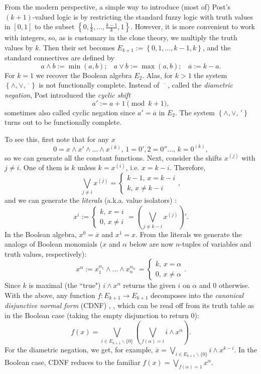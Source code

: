\documentclass[11pt]{article}
\theoremstyle{plain}
\theoremstyle{definition}
\def\ds{\displaystyle}
\def\-{\backslash}
\def\a{\alpha}
\def\nx{\overline{x}}
\begin{document}
From the modern perspective, a simple way to introduce (most of) Post's $(k+1)$-valued logic is by restricting the standard fuzzy logic with truth values in $[0,1]$ to the subset $\ds{\left\{0,\frac1k,\dots,\frac{k-1}k,1\right\}}$. However, it is more convenient to work with integers, so, as is customary in the clone theory, we multiply the truth values by $k$. Then their set becomes $\ds{E_{k+1}:=\left\{0,1,\dots,k-1,k\right\}}$, and the standard connectives are defined by
$$
a\land b:=\min(a,b);\ \ \ \ a\lor b:=\max(a,b);\ \ \ \ \overline{a}:=k-a.
$$
For $k=1$ we recover the Boolean algebra $E_2$. Alas, for $k>1$ the system $\left\{\land,\lor,\overline{\phantom{a}}\right\}$ is not functionally complete. Instead of $\,\overline{\phantom{a}}\,$, called the {\it diametric negation}, Post introduced the {\it cyclic shift} 
$$
a':=a+1\pmod{k+1},
$$
sometimes also called cyclic negation since $a'=\overline{a}$ in $E_2$. The system $\left\{\land,\lor,\,'\right\}$ turns out to be functionally complete.

To see this, first note that for any $x$
$$
0=x\land x'\land\dots\land x^{(k)},\, 1=0',2=0''\dots,\,k=0^{(k)},
$$
so we can generate all the constant functions. Next, consider the shifts $x^{(j)}$ with $j\neq i$. One of them is $k$ unless $k=x^{(i)}$, i.e. $x=k-i$. Therefore,
$$
\bigvee_{j\neq i} x^{(j)}=\begin{cases}k-1,\,x=k-i\\
k,\,x\neq k-i\end{cases}\!\!\!\!\!\!,
$$
and we can generate the {\it literals} (a.k.a. value isolators) \cite{Ros76}:
$$
x^i:=\begin{cases}k,\,x=i\\
0,\,x\neq i\end{cases}\!\!\!\!\!
=\left(\bigvee_{j\neq k-i} x^{(j)}\right)'.
$$
In the Boolean algebra, $x^0=\nx$ and $x^1=x$. From the literals we generate the analogs of Boolean monomials ($x$ and $\a$ below are now $n$-tuples of variables and truth values, respectively):
\begin{equation}\label{liter}
x^\a:=x_1^{\a_1}\land\dots\land x_n^{\a_n}\,
=\begin{cases}k,\,x=\a\\
0,\,x\neq \a\end{cases}.
\end{equation}
Since $k$ is maximal (the ``true") $i\land x^\a$ returns the given $i$ on $\a$ and $0$ otherwise. With the above,  any function $f:E_{k+1}\to E_{k+1}$ decomposes into the {\it canonical disjunctive normal form} (CDNF) \cite[1.4]{Lau}, \cite{Ros76}, which can be read off from its truth table as in the Boolean case (taking the empty disjunction to return $0$):
\begin{equation}\label{CDNF}
f(x)=\bigvee_{i\in E_{k+1}\-\{0\}} 
\left(\bigvee_{f(\a)=i}i\land x^\a\right).
\end{equation}
For the diametric negation, we get, for example, $\ds{\nx=\!\!\!\!\!\!\bigvee_{i\in E_{k+1}\-\{0\}}\!\!\!\!\!\!\!\!i\land x^{k-i}}$. In the Boolean case, CDNF reduces to the familiar $\ds{f(x)=\bigvee_{f(\a)=1}x^\a}$.
\end{document}
